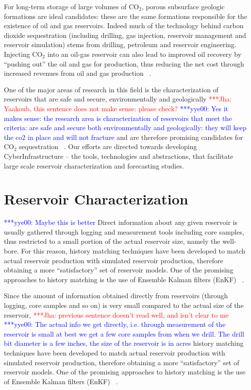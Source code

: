 \documentclass[10pt,conference,final]{IEEEtran}
\newcommand{\jhanote}[1]{ {\textcolor{red} { ***Jha: #1 }}}
\newcommand{\yyenote}[1]{ {\textcolor{blue} { ***yye00: #1 }}}
\newcommand{\jhanote}[1]{}
\newcommand{\yyenote}[1]{}
\begin{document}
For long-term storage of large volumes of CO$_2$, porous subsurface geologic formations are ideal candidates: these are the same formations responsible for the existence of oil and gas reservoirs. Indeed much of the technology behind carbon dioxide sequestration (including drilling, gas injection, reservoir management and reservoir simulation) stems from drilling, petroleum and reservoir engineering. Injecting CO$_2$ into an oil-gas reservoir can also lead to improved oil recovery by ``pushing out'' the oil and gas for production, thus reducing the net cost through increased revenues from oil and gas production ~\cite{EORBook}.

One of the major areas of research in this field is the characterization of reservoirs that are safe and secure, environmentally and geologically \jhanote{Yaakoub, this sentence does not make sense: please check?} \yyenote{Yes it makes sense: the research area is characterization of reservoirs that meet the criteria: are safe and secure both environmentally and geologically: they will keep the co2 in place and will not fracture}  and are therefore promising candidates for CO$_2$ sequestration ~\cite{GeoRPT,Luigi}. Our efforts are directed towards developing CyberInfrastructure -- the tools, technologies and abstractions, that facilitate large scale reservoir characterization and forecasting studies.

\section*{Reservoir Characterization}
\yyenote{Maybe this is better}
Direct information about any given reservoir is usually gathered through logging
and measurement tools including core samples, thus restricted to a small portion of the
actual reservoir size, namely the well-bore. For this reason, history matching techniques have been 
developed to match actual reservoir production with simulated reservoir production, therefore 
obtaining a more ``satisfactory'' set of reservoir models. One of the promising approaches to history
matching is the use of Ensemble Kalman filters (EnKF) ~\cite{KalmanPaper, DO2007, LiEnKF07, DO2006}.



Since the amount of information obtained directly from reservoirs (through logging, core samples and so on) is very small compared to the actual size of the reservoir, \jhanote{previous sentence doesn't read well, and isn't clear to me} \yyenote{The actual info we get directly, i.e. through measurement of the reservoir is small at best we get a few core samples from when we drill. The drill bit diameter is a few inches, the size of the reservoir is in acres} history matching techniques have been developed to match actual reservoir production with simulated reservoir production, therefore obtaining a more ``satisfactory'' set of reservoir models. One of the promising approaches to history matching is the use of Ensemble Kalman filters (EnKF) ~\cite{KalmanPaper, DO2007, LiEnKF07, DO2006}.
\end{document}
